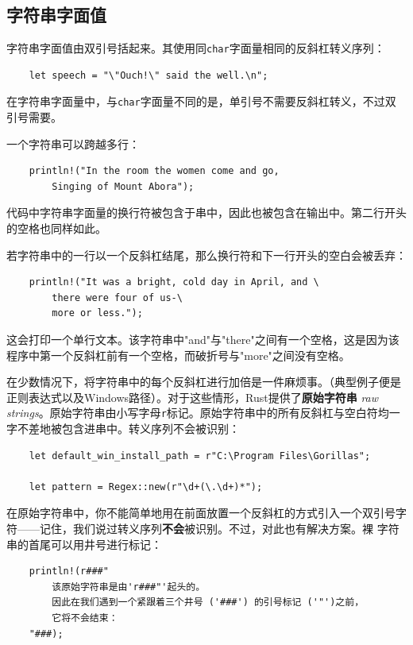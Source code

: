 \medskip
\subsection{字符串字面值}
字符串字面值由双引号括起来。其使用同\texttt{char}字面量相同的反斜杠转义序列：
\begin{verbatim}
    let speech = "\"Ouch!\" said the well.\n";
\end{verbatim}
 
\smallskip
在字符串字面量中，与\texttt{char}字面量不同的是，单引号不需要反斜杠转义，不过双引号需要。

\medskip
一个字符串可以跨越多行：
\begin{verbatim}
    println!("In the room the women come and go,
        Singing of Mount Abora");
\end{verbatim}

\smallskip
代码中字符串字面量的换行符被包含于串中，因此也被包含在输出中。第二行开头的空格也同样如此。

\medskip
若字符串中的一行以一个反斜杠结尾，那么换行符和下一行开头的空白会被丢弃：
\begin{verbatim}
    println!("It was a bright, cold day in April, and \
        there were four of us-\
        more or less.");
\end{verbatim}

\smallskip
这会打印一个单行文本。该字符串中"and"与"there"之间有一个空格，这是因为该程序中第一个反斜杠前有一个空格，而破折号与"more"之间没有空格。

\medskip
在少数情况下，将字符串中的每个反斜杠进行加倍是一件麻烦事。（典型例子便是正则表达式以及Windows路径）。对于这些情形，Rust提供了\textbf{原始字符串}
\textit{raw strings}。原始字符串由小写字母\texttt{r}标记。原始字符串中的所有反斜杠与空白符均一字不差地被包含进串中。转义序列不会被识别：
\begin{verbatim}
    let default_win_install_path = r"C:\Program Files\Gorillas";
    
    let pattern = Regex::new(r"\d+(\.\d+)*");
\end{verbatim}

\smallskip
在原始字符串中，你不能简单地用在前面放置一个反斜杠的方式引入一个双引号字符------记住，我们说过转义序列\textbf{不会}被识别。不过，对此也有解决方案。裸
字符串的首尾可以用井号进行标记：
\begin{verbatim}
    println!(r###"
        该原始字符串是由'r###"'起头的。
        因此在我们遇到一个紧跟着三个井号 ('###') 的引号标记 ('"')之前，
        它将不会结束：
    "###);
\end{verbatim}

